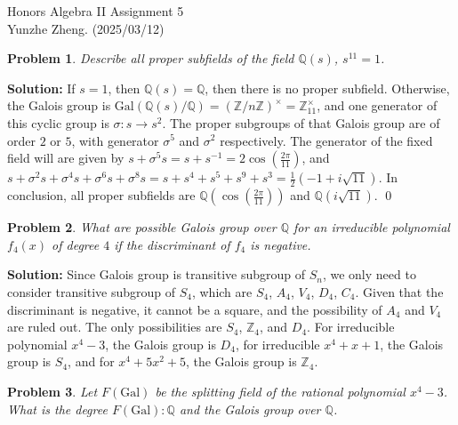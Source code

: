\documentclass[12pt]{article}
\newtheorem{problem}{Problem}
\begin{document}
\noindent Honors Algebra II \hfill Assignment 5\\
Yunzhe Zheng. (2025/03/12)

\hrulefill

\begin{problem}
Describe all proper subfields of the field $\mathbb{Q}(s)$, $s^{11}=1$.
\end{problem}

\textbf{Solution:} If $s=1$, then $\mathbb{Q}(s)=\mathbb{Q}$, then there is no proper subfield. Otherwise, the Galois group is $\text{Gal}(\mathbb{Q}(s)/\mathbb{Q})=(\mathbb{Z}/n\mathbb{Z})^{\times}=\mathbb{Z}_{11}^\times$, and one generator of this cyclic group is $\sigma: s\to s^2$. The proper subgroups of that Galois group are of order $2$ or $5$, with generator $\sigma^{5}$ and $\sigma^{2}$ respectively. The generator of the fixed field will are given by $s+\sigma^{5}s=s+s^{-1}=2\cos(\frac{2\pi}{11})$, and $s+\sigma^{2}s+\sigma^{4}s+\sigma^{6}s+\sigma^{8}s=s+s^4+s^5+s^9+s^3=\frac{1}{2}(-1+i\sqrt{11})$. In conclusion, all proper subfields are $\mathbb{Q}(\cos(\frac{2\pi}{11}))$ and $\mathbb{Q}(i\sqrt{11})$. \qed
\\
\begin{problem}
What are possible Galois group over $\mathbb{Q}$ for an irreducible polynomial $f_{4}(x)$ of degree $4$ if the discriminant of $f_{4}$ is negative.
\end{problem}

\textbf{Solution:} Since Galois group is transitive subgroup of $S_{n}$, we only need to consider transitive subgroup of $S_{4}$, which are $S_{4}$, $A_{4}$, $V_{4}$, $D_{4}$, $C_{4}$. Given that the discriminant is negative, it cannot be a square, and the possibility of $A_{4}$ and $V_{4}$ are ruled out. The only possibilities are $S_{4}$, $\mathbb{Z}_{4}$, and $D_{4}$. For irreducible polynomial $x^4-3$, the Galois group is $D_4$, for irreducible $x^4+x+1$, the Galois group is $S_{4}$, and for $x^4+5x^2+5$, the Galois group is $\mathbb{Z}_{4}$.
\\
\begin{problem}
Let $F(\text{Gal})$ be the splitting field of the rational polynomial $x^4-3$. What is the degree $F(\text{Gal}): \mathbb{Q}$ and the Galois group over $\mathbb{Q}$. 
\end{problem}
\end{document}
